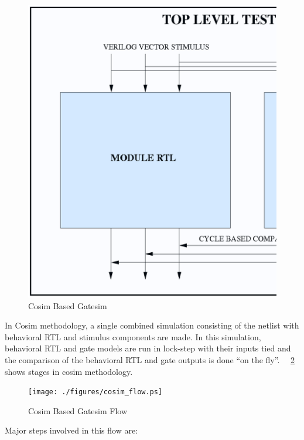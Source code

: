 \begin{figure}[h!]
\centering
\includegraphics[scale=0.35]{./figures/cosim.ps}
\caption{Cosim Based Gatesim}
\label{fig:cosim.ps}
\end{figure}


 In Cosim methodology, a single combined simulation consisting of the netlist with behavioral RTL and stimulus components are made. In this simulation, behavioral RTL and gate models are run in lock-step with their inputs tied and the comparison of the behavioral RTL and gate outputs is done ``on the fly''. ~\figurename{~\ref{fig:cosim_flow.ps}} shows stages in cosim methodology.




\begin{figure}[h]
\centering
\texttt{[image: ./figures/cosim\_flow.ps]}
\caption{Cosim Based Gatesim Flow}
\label{fig:cosim_flow.ps}
\end{figure}

Major steps involved in this flow are:

